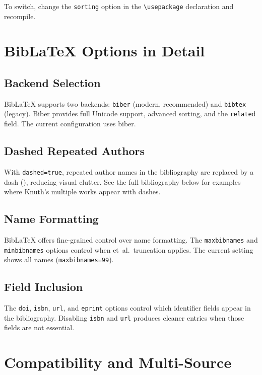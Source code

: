 \documentclass[
    language=english,
    doctype=article,
    institution=none,
]{../../omnilatex}
\begin{document}
To switch, change the \texttt{sorting} option in the \verb|\usepackage|
declaration and recompile.

\section{BibLaTeX Options in Detail}
\label{sec:options}

\subsection{Backend Selection}

BibLaTeX supports two backends: \texttt{biber} (modern, recommended) and
\texttt{bibtex} (legacy).  Biber provides full Unicode support, advanced
sorting, and the \texttt{related} field.  The current configuration uses
biber.

\subsection{Dashed Repeated Authors}

With \texttt{dashed=true}, repeated author names in the bibliography are
replaced by a dash (\textemdash), reducing visual clutter.  See the full
bibliography below for examples where Knuth's multiple works appear with
dashes.

\subsection{Name Formatting}

BibLaTeX offers fine-grained control over name formatting.  The
\texttt{maxbibnames} and \texttt{minbibnames} options control when
et~al.~truncation applies.  The current setting shows all names
(\texttt{maxbibnames=99}).

\subsection{Field Inclusion}

The \texttt{doi}, \texttt{isbn}, \texttt{url}, and \texttt{eprint}
options control which identifier fields appear in the bibliography.
Disabling \texttt{isbn} and \texttt{url} produces cleaner entries when
those fields are not essential.

\section{Compatibility and Multi-Source}
\label{sec:multi-source}
\end{document}
